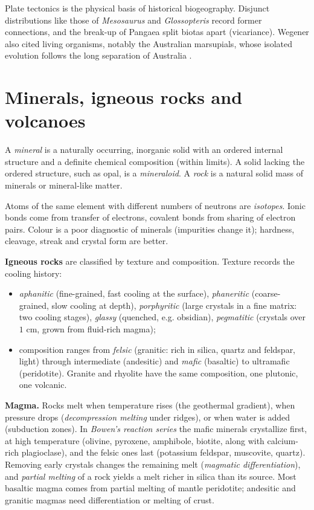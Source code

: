 \begin{remark}
\label{remark-tectonics-biogeography}
Plate tectonics is the physical basis of
historical biogeography. Disjunct
distributions like those of
\emph{Mesosaurus} and \emph{Glossopteris}
record former connections, and the
break-up of Pangaea split biotas apart
(vicariance). Wegener also cited living
organisms, notably the Australian
marsupials, whose isolated evolution
follows the long separation of Australia
\cite[Chapter 2]{tarbuckciencias}.
\end{remark}

\section{Minerals, igneous rocks and
volcanoes}
\label{section-igneous}

\begin{definition}
\label{definition-mineral}
A \emph{mineral} is a naturally occurring,
inorganic solid with an ordered internal
structure and a definite chemical
composition (within limits). A solid
lacking the ordered structure, such as
opal, is a \emph{mineraloid}. A
\emph{rock} is a natural solid mass of
minerals or mineral-like matter.
\end{definition}

Atoms of the same element with different
numbers of neutrons are \emph{isotopes}.
Ionic bonds come from transfer of
electrons, covalent bonds from sharing of
electron pairs. Colour is a poor diagnostic
of minerals (impurities change it);
hardness, cleavage, streak and crystal form
are better.

\textbf{Igneous rocks} are classified by
texture and composition. Texture records
the cooling history:
\begin{itemize}
\item \emph{aphanitic} (fine-grained, fast
cooling at the surface), \emph{phaneritic}
(coarse-grained, slow cooling at depth),
\emph{porphyritic} (large crystals in a
fine matrix: two cooling stages),
\emph{glassy} (quenched, e.g. obsidian),
\emph{pegmatitic} (crystals over $1$ cm,
grown from fluid-rich magma);
\item composition ranges from
\emph{felsic} (granitic: rich in silica,
quartz and feldspar, light) through
intermediate (andesitic) and \emph{mafic}
(basaltic) to ultramafic (peridotite).
Granite and rhyolite have the same
composition, one plutonic, one volcanic.
\end{itemize}

\textbf{Magma.} Rocks melt when temperature
rises (the geothermal gradient), when
pressure drops (\emph{decompression
melting} under ridges), or when water is
added (subduction zones). In \emph{Bowen's
reaction series} the mafic minerals
crystallize first, at high temperature
(olivine, pyroxene, amphibole, biotite,
along with calcium-rich plagioclase), and
the felsic ones last (potassium feldspar,
muscovite, quartz). Removing early crystals
changes the remaining melt
(\emph{magmatic differentiation}), and
\emph{partial melting} of a rock yields a
melt richer in silica than its source.
Most basaltic magma comes from partial
melting of mantle peridotite; andesitic and
granitic magmas need differentiation or
melting of crust.

